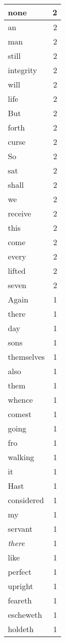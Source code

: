 \begin{center}
\begin{longtable}{l|r}
none & 2\\ \hline 
an & 2\\ \hline 
man & 2\\ \hline 
still & 2\\ \hline 
integrity & 2\\ \hline 
will & 2\\ \hline 
life & 2\\ \hline 
But & 2\\ \hline 
forth & 2\\ \hline 
curse & 2\\ \hline 
So & 2\\ \hline 
sat & 2\\ \hline 
shall & 2\\ \hline 
we & 2\\ \hline 
receive & 2\\ \hline 
this & 2\\ \hline 
come & 2\\ \hline 
every & 2\\ \hline 
lifted & 2\\ \hline 
seven & 2\\ \hline 
Again & 1\\ \hline 
there & 1\\ \hline 
day & 1\\ \hline 
sons & 1\\ \hline 
themselves & 1\\ \hline 
also & 1\\ \hline 
them & 1\\ \hline 
whence & 1\\ \hline 
comest & 1\\ \hline 
going & 1\\ \hline 
fro & 1\\ \hline 
walking & 1\\ \hline 
it & 1\\ \hline 
Hast & 1\\ \hline 
considered & 1\\ \hline 
my & 1\\ \hline 
servant & 1\\ \hline 
\emph{there} & 1\\ \hline 
like & 1\\ \hline 
perfect & 1\\ \hline 
upright & 1\\ \hline 
feareth & 1\\ \hline 
escheweth & 1\\ \hline 
holdeth & 1\\ \hline 

\end{longtable}
\end{center}
